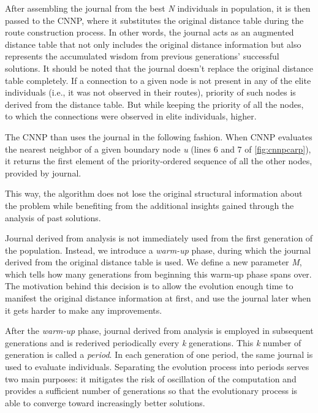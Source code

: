 \documentclass[twoside]{ctuthesis}
\theoremstyle{plain}
\theoremstyle{definition}
\theoremstyle{note}
\begin{document}
After assembling the journal from the best \emph{N} individuals in population, it is then passed to the CNNP, where it substitutes the original distance table during the route construction process. In other words, the journal acts as an augmented distance table that not only includes the original distance information but also represents the accumulated wisdom from previous generations' successful solutions. It should be noted that the journal doesn't replace the original distance table completely. 
If a connection to a given node is not present in any of the elite individuals (i.e., it was not observed in their routes), priority of such nodes is derived from the distance table. But while keeping the priority of all the nodes, to which the connections were observed in elite individuals, higher. 

The CNNP than uses the journal in the following fashion. When CNNP evaluates the nearest neighbor of a given boundary node \emph{u} (lines 6 and 7 of \ref{fig:cnnpcarp}), it returns the first element of the priority-ordered sequence of all the other nodes, provided by journal.

This way, the algorithm does not lose the original structural information about the problem while benefiting from the additional insights gained through the analysis of past solutions. 




Journal derived from analysis is not immediately used from the first generation of the population. Instead, we introduce a \emph{warm-up} phase, during which the journal derived from the original distance table is used. We define a new parameter \emph{M}, which tells how many generations from beginning this warm-up phase spans over.
The motivation behind this decision is to allow the evolution enough time to manifest the original distance information at first, and use the journal later when it gets harder to make any improvements.

After the \emph{warm-up} phase, journal derived from analysis is employed in subsequent generations and is rederived periodically every \emph{k} generations. This \emph{k} number of generation is called a \emph{period}. In each generation of one period, the same journal is used to evaluate individuals. Separating the evolution process into periods serves two main purposes: it mitigates the risk of oscillation of the computation and provides a sufficient number of generations so that the evolutionary process is able to converge toward increasingly better solutions.
\end{document}
